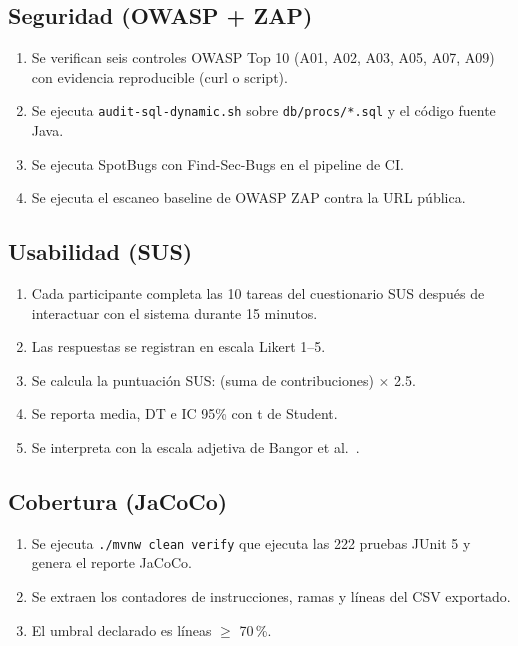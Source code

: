 \subsection{Seguridad (OWASP + ZAP)}

\begin{enumerate}
  \item Se verifican seis controles OWASP Top 10 (A01, A02, A03, A05, A07, A09) con evidencia reproducible (curl o script).
  \item Se ejecuta \texttt{audit-sql-dynamic.sh} sobre \texttt{db/procs/*.sql} y el código fuente Java.
  \item Se ejecuta SpotBugs con Find-Sec-Bugs en el pipeline de CI.
  \item Se ejecuta el escaneo baseline de OWASP ZAP contra la URL pública.
\end{enumerate}

\subsection{Usabilidad (SUS)}

\begin{enumerate}
  \item Cada participante completa las 10 tareas del cuestionario SUS \cite{brooke1996} después de interactuar con el sistema durante 15 minutos.
  \item Las respuestas se registran en escala Likert 1--5.
  \item Se calcula la puntuación SUS: (suma de contribuciones) $\times$ 2.5.
  \item Se reporta media, DT e IC 95\% con t de Student.
  \item Se interpreta con la escala adjetiva de Bangor et al.~\cite{bangor2009,bangor2008}.
\end{enumerate}

\subsection{Cobertura (JaCoCo)}

\begin{enumerate}
  \item Se ejecuta \texttt{./mvnw clean verify} que ejecuta las 222 pruebas JUnit 5 y genera el reporte JaCoCo.
  \item Se extraen los contadores de instrucciones, ramas y líneas del CSV exportado.
  \item El umbral declarado es líneas $\geq$ 70\,\%.
\end{enumerate}

